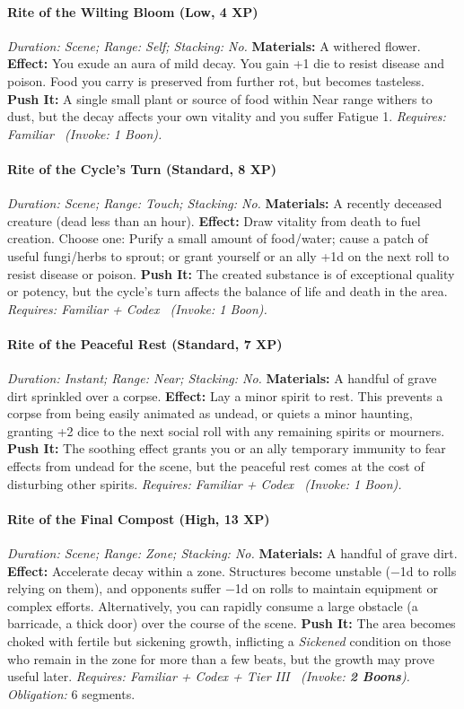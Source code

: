 \documentclass[12pt,twoside]{book}
\begin{document}
\paragraph{Rite of the Wilting Bloom (Low, 4 XP)} \emph{Duration: Scene; Range: Self; Stacking: No.}
\textbf{Materials:} A withered flower.
\textbf{Effect:} You exude an aura of mild decay. You gain +1 die to resist disease and poison. Food you carry is preserved from further rot, but becomes tasteless.
\textbf{Push It:} A single small plant or source of food within Near range withers to dust, but the decay affects your own vitality and you suffer Fatigue 1.
\emph{Requires: Familiar \ (\textit{Invoke:} 1 Boon).}
\paragraph{Rite of the Cycle's Turn (Standard, 8 XP)} \emph{Duration: Scene; Range: Touch; Stacking: No.}
\textbf{Materials:} A recently deceased creature (dead less than an hour).
\textbf{Effect:} Draw vitality from death to fuel creation. Choose one: Purify a small amount of food/water; cause a patch of useful fungi/herbs to sprout; or grant yourself or an ally +1d on the next roll to resist disease or poison.
\textbf{Push It:} The created substance is of exceptional quality or potency, but the cycle's turn affects the balance of life and death in the area.
\emph{Requires: Familiar + Codex \ (\textit{Invoke:} 1 Boon).}
\paragraph{Rite of the Peaceful Rest (Standard, 7 XP)} \emph{Duration: Instant; Range: Near; Stacking: No.}
\textbf{Materials:} A handful of grave dirt sprinkled over a corpse.
\textbf{Effect:} Lay a minor spirit to rest. This prevents a corpse from being easily animated as undead, or quiets a minor haunting, granting +2 dice to the next social roll with any remaining spirits or mourners.
\textbf{Push It:} The soothing effect grants you or an ally temporary immunity to fear effects from undead for the scene, but the peaceful rest comes at the cost of disturbing other spirits.
\emph{Requires: Familiar + Codex \ (\textit{Invoke:} 1 Boon).}
\paragraph{Rite of the Final Compost (High, 13 XP)} \emph{Duration: Scene; Range: Zone; Stacking: No.}
\textbf{Materials:} A handful of grave dirt.
\textbf{Effect:} Accelerate decay within a zone. Structures become unstable (−1d to rolls relying on them), and opponents suffer −1d on rolls to maintain equipment or complex efforts. Alternatively, you can rapidly consume a large obstacle (a barricade, a thick door) over the course of the scene.
\textbf{Push It:} The area becomes choked with fertile but sickening growth, inflicting a \emph{Sickened} condition on those who remain in the zone for more than a few beats, but the growth may prove useful later.
\emph{Requires: Familiar + Codex + Tier III \ (\textit{Invoke:} \textbf{2 Boons}).}
\emph{Obligation:} 6 segments.
\end{document}
